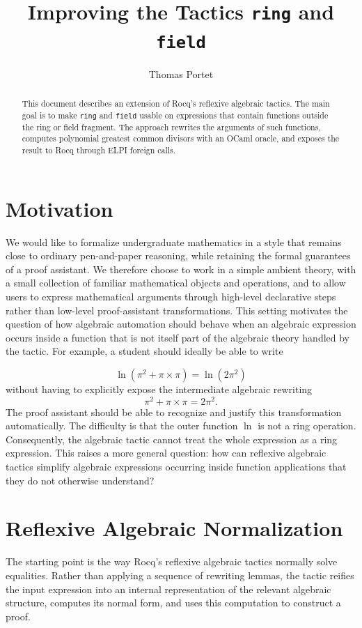 \documentclass[11pt]{article}
\title{Improving the Tactics \texttt{ring} and \texttt{field}\\
 }
\author{Thomas Portet}
\begin{document}
\maketitle

\begin{abstract}
This document describes an extension of Rocq's reflexive algebraic tactics. The
main goal is to make \texttt{ring} and \texttt{field} usable on expressions that
contain functions outside the ring or field fragment. The approach rewrites the
arguments of such functions, computes polynomial greatest common divisors with
an OCaml oracle, and exposes the result to Rocq through ELPI foreign calls.
\end{abstract}
\section{Motivation}

We would like to formalize undergraduate mathematics in a style that remains close to ordinary pen-and-paper reasoning, while retaining the formal guarantees of a proof assistant. We therefore choose to work in a simple ambient theory, with a small collection of familiar mathematical objects and operations, and to allow users to express mathematical arguments through high-level declarative steps rather than low-level proof-assistant transformations.
\newline \newline
This setting motivates the question of how algebraic automation should behave when an algebraic expression occurs inside a function that is not itself part of the algebraic theory handled by the tactic. For example, a student should ideally be able to write

\[
\ln(\pi^2+\pi\times\pi)=\ln(2\pi^2)
\]
without having to explicitly expose the intermediate algebraic rewriting
\[
\pi^2+\pi\times\pi=2\pi^2.
\]
The proof assistant should be able to recognize and justify this transformation automatically.\newline
The difficulty is that the outer function $\ln$ is not a ring operation. Consequently, the algebraic tactic cannot treat the whole expression as a ring expression. This raises a more general question: how can reflexive algebraic tactics simplify algebraic expressions occurring inside function applications that they do not otherwise understand?

\section{Reflexive Algebraic Normalization}
The starting point is the way Rocq's reflexive algebraic tactics normally solve
equalities. Rather than applying a sequence of rewriting lemmas, the tactic
reifies the input expression into an internal representation of the relevant
algebraic structure, computes its normal form, and uses this computation to
construct a proof.
\end{document}
